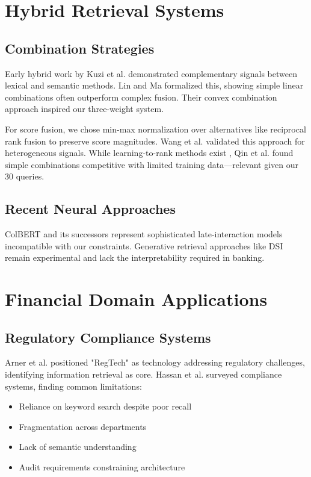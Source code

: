 \section{Hybrid Retrieval Systems}

\subsection{Combination Strategies}

Early hybrid work by Kuzi et al. \cite{kuzi2020hybrid} demonstrated complementary signals between lexical and semantic methods. Lin and Ma \cite{lin2021pretrained} formalized this, showing simple linear combinations often outperform complex fusion. Their convex combination approach inspired our three-weight system.

For score fusion, we chose min-max normalization over alternatives like reciprocal rank fusion \cite{cormack2009rrf} to preserve score magnitudes. Wang et al. \cite{wang2023improving} validated this approach for heterogeneous signals. While learning-to-rank methods exist \cite{liu2009learning,burges2005learning}, Qin et al. \cite{qin2021neural} found simple combinations competitive with limited training data—relevant given our 30 queries.

\subsection{Recent Neural Approaches}

ColBERT \cite{khattab2020colbert} and its successors represent sophisticated late-interaction models incompatible with our constraints. Generative retrieval approaches like DSI \cite{tay2022transformer} remain experimental and lack the interpretability required in banking.

\section{Financial Domain Applications}

\subsection{Regulatory Compliance Systems}

Arner et al. \cite{arner2017fintech} positioned "RegTech" as technology addressing regulatory challenges, identifying information retrieval as core. Hassan et al. \cite{hassan2022compliance} surveyed compliance systems, finding common limitations:
\begin{itemize}[leftmargin=*,itemsep=2pt,topsep=2pt]
 \item Reliance on keyword search despite poor recall
 \item Fragmentation across departments  
 \item Lack of semantic understanding
 \item Audit requirements constraining architecture
\end{itemize}

